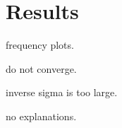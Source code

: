 \chapter{Results} %
\label{cha:results}
frequency plots.

do not converge.

inverse sigma is too large.

no explanations.
